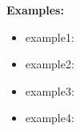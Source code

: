 \textbf{Examples:}
\begin{itemize}
	\item example1:
\end{itemize}



\begin{itemize}
	\item example2:
\end{itemize}



\begin{itemize}
	\item example3:
\end{itemize}



\begin{itemize}
	\item example4:
\end{itemize}


